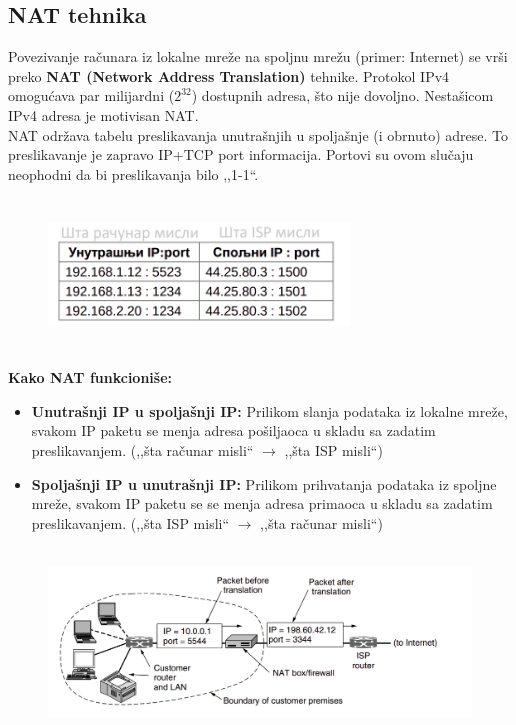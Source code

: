 \documentclass[a4paper]{article}
\begin{document}
    \subsection{NAT tehnika}
        Povezivanje računara iz lokalne mreže na spoljnu mrežu (primer: Internet) se vrši preko
        \textbf{NAT (Network Address Translation)} tehnike. Protokol IPv4 omogućava par milijardni 
        ($2^{32}$) dostupnih adresa, što nije dovoljno. Nestašicom IPv4 adresa je motivisan NAT.\\
        \indent NAT održava tabelu preslikavanja unutrašnjih u spoljašnje (i obrnuto) adrese.
        To preslikavanje je zapravo IP+TCP port informacija. Portovi su ovom slučaju neophodni
        da bi preslikavanja bilo ,,1-1``.
        \begin{figure}[H]
            \begin{center}
                \includegraphics[width=80mm,height=40mm]{Slike/nat1.png}
            \end{center}
        \end{figure}
        \noindent \textbf{Kako NAT funkcioniše:}
        \begin{itemize}
            \item \textbf{Unutrašnji IP u spoljašnji IP:} Prilikom slanja podataka iz lokalne mreže,
                  svakom IP paketu se menja adresa pošiljaoca u skladu sa zadatim preslikavanjem.
                  (,,šta računar misli`` $\rightarrow$ ,,šta ISP misli``) 
            \item \textbf{Spoljašnji IP u unutrašnji IP:} Prilikom prihvatanja podataka iz spoljne mreže,
                  svakom IP paketu se se menja adresa primaoca u skladu sa zadatim preslikavanjem.
                  (,,šta ISP misli`` $\rightarrow$ ,,šta računar misli``) 
        \end{itemize}
        \begin{figure}[H]
            \begin{center}
                \includegraphics[width=120mm,height=50mm]{Slike/nat2.png}
            \end{center}
        \end{figure}
\end{document}
